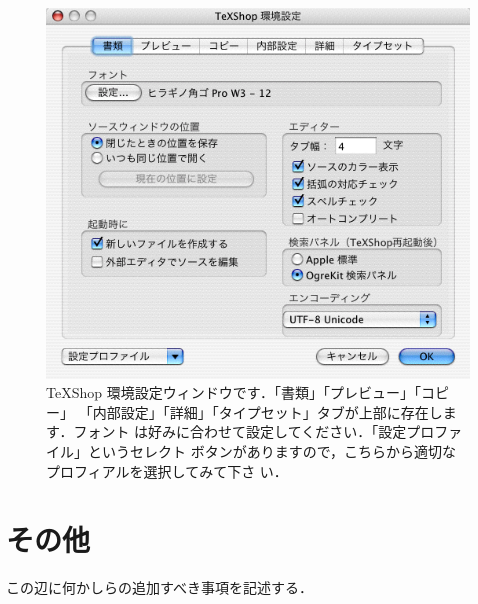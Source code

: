 \begin{figure}[htbp]
 \begin{center}
 \includegraphics[scale=.4]{images/TeXShop08} 
 \caption[\TeX Shop の環境設定ウィンドウ]{
  \TeX Shop 環境設定ウィンドウです．「書類」「プレビュー」「コピー」
  「内部設定」「詳細」「タイプセット」タブが上部に存在します．フォント
  は好みに合わせて設定してください．「設定プロファイル」というセレクト
  ボタンがありますので，こちらから適切なプロフィアルを選択してみて下さ
  い．}
 \end{center}
\end{figure}



\section{その他}


\begin{append}
 この辺に何かしらの追加すべき事項を記述する．
\end{append}
